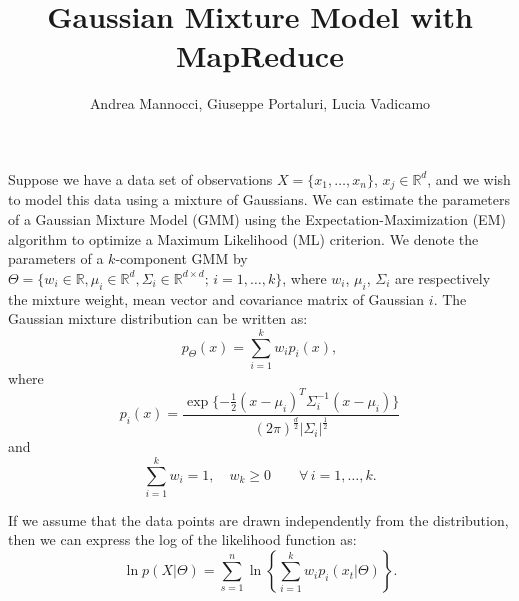 \documentclass[a4paper,10pt]{article}
\title{Gaussian Mixture Model with MapReduce}%
\author{Andrea Mannocci, Giuseppe Portaluri, Lucia Vadicamo}
\date{}
\begin{document}
\maketitle
Suppose we have a data set of observations $X=\{x_1, \dots, x_n\}$, $x_j\in \mathbb{R}^d$, and we wish to model this data using a mixture of Gaussians. We can estimate the parameters of a Gaussian Mixture Model (GMM) using the Expectation-Maximization (EM) algorithm \cite{bishop06} to optimize a Maximum Likelihood (ML) criterion.
We denote the parameters of a $k$-component GMM by $\Theta=\{w_i \in \mathbb{R}, \mu_{i}\in\mathbb{R}^d, \Sigma_i \in \mathbb{R}^{d\times d};\, i=1,\dots, k\}$, where $w_{i}$, $\mu_i$, $\Sigma_i$ are respectively the mixture weight, mean vector and covariance matrix of Gaussian $i$.
The Gaussian mixture distribution can be written as:
\begin{equation}
p_\Theta(x)=\sum_{i=1}^k w_i p_i(x),
\end{equation}
where
\begin{equation}
p_i(x)=\dfrac{\exp\{-\frac{1}{2}(x-\mu_i )^T\Sigma_i^{-1}(x-\mu_i )\}}{(2\pi)^{\frac{d}{2}} |\Sigma_i|^\frac{1}{2}}
\end{equation}
and 
\begin{equation}
\label{eq:constrain}
\sum_{i=1}^k w_i=1, \quad w_k\geq 0 \qquad \forall\,  i=1, \dots, k.
\end{equation}


If we assume that the data points are drawn independently from the distribution, then we can express the log of the likelihood function as:
\begin{equation}
\ln p(X| \Theta)=\sum_{s=1}^ n \ln \left\{ \sum_{i=1}^k w_i p_i(x_t|\Theta)\right\}.
\end{equation} 

\end{document}
